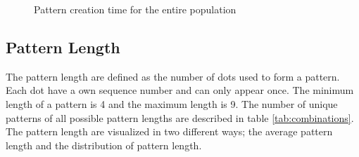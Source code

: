 		\begin{figure}[H]
      \caption{Pattern creation time for the entire population}
      \label{fig:patterncreationtimepopulation}
    \end{figure}

	\subsection{Pattern Length}

    The pattern length are defined as the number of dots used to form a pattern. Each dot have a own sequence number and can only appear once. The minimum length of a pattern is 4 and the maximum length is 9. The number of unique patterns of all possible pattern lengths are described in table \ref{tab:combinations}. The pattern length are visualized in two different ways; the average pattern length and the distribution of pattern length.

